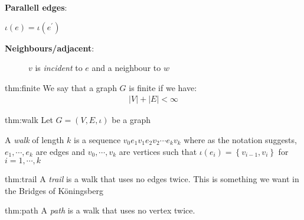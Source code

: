 \par\bigskip
\noindent\textbf{Parallell edges}:\par
\noindent $\iota(e) = \iota(e^{\prime})$
\begin{figure}[ht!]
    \centering
    \caption{}
\end{figure}
\par\bigskip
\noindent\textbf{Neighbours/adjacent}:\par
\begin{figure}[ht!]
    \centering
    \caption{$v$ is \textit{incident} to $e$ and a neighbour to $w$}
\end{figure}
\newpage
\begin{theo}{thm:finite}
  We say that a graph $G$ is finite if we have:
  \begin{equation*}
    \begin{gathered}
      \left|V\right|+\left|E\right|< \infty
    \end{gathered}
  \end{equation*}
\end{theo}
\par\bigskip
\begin{theo}[Walk]{thm:walk}
  Let $G = (V,E,\iota)$ be a graph\par
  \noindent A \textit{walk} of length $k$ is a sequence $v_0e_1v_1e_2v_2\cdots e_kv_k$ where as the notation suggests, $e_1,\cdots,e_k$ are edges and $v_0,\cdots,v_k$ are vertices such that $\iota(e_i) = \left\{v_{i-1},v_i\right\}$ for $i=1,\cdots,k$
\end{theo}
\par\bigskip
\begin{theo}[Trail]{thm:trail}
  A \textit{trail} is a walk that uses no edges twice. This is something we want in the Bridges of Köningsberg
\end{theo}
\par\bigskip
\begin{theo}[Path]{thm:path}
  A \textit{path} is a walk that uses no vertex twice.
\end{theo}
